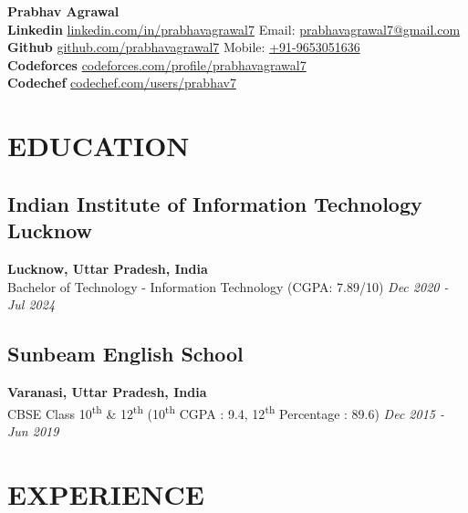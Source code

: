\documentclass[12pt]{article}
\begin{document}
{\LARGE\textbf{Prabhav Agrawal}} \\
\vspace*{5pt}
\small{\textbf{Linkedin} \hspace*{23pt} \href{https://linkedin.com/in/prabhavagrawal7}{linkedin.com/in/prabhavagrawal7} \hfill Email: \href{mailto:prabhavagrawal7@gmail.com}{prabhavagrawal7@gmail.com}\\
	\textbf{Github} \hspace*{31.5pt} \href{https://github.com/prabhavagrawal7}{github.com/prabhavagrawal7} \hfill Mobile: \href{tel:+919653051636}{+91-9653051636}\\
	\textbf{Codeforces} \hspace*{10pt} \href{https://codeforces.com/profile/prabhavagrawal7}{codeforces.com/profile/prabhavagrawal7}\\
	\textbf{Codechef} \hspace*{19pt} \href{https://codechef.com/users/prabhav7}{codechef.com/users/prabhav7}
}
\section*{EDUCATION}
\subsection*{Indian Institute of Information Technology Lucknow}	\hfill\textbf{Lucknow, Uttar Pradesh, India} \\
Bachelor of Technology - Information Technology (CGPA: 7.89/10) 	\hfill\textit{Dec 2020 -  Jul 2024} \\
\vspace{-5pt}
\subsection*{Sunbeam English School}	\hfill\textbf{Varanasi, Uttar Pradesh, India} \\
CBSE Class 10\textsuperscript{th} \& 12\textsuperscript{th} (10\textsuperscript{th} CGPA : 9.4, 12\textsuperscript{th} Percentage : 89.6) \hfill \textit{Dec 2015 - Jun 2019} \\

\section*{EXPERIENCE}
\end{document}

